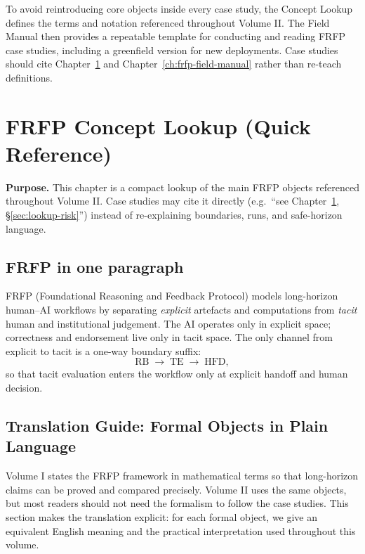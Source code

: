 To avoid reintroducing core objects inside every case study, the Concept Lookup defines the terms and notation referenced throughout Volume II. The Field Manual then provides a repeatable template for conducting and reading FRFP case studies, including a greenfield version for new deployments. Case studies should cite Chapter~\ref{ch:frfp-lookup} and Chapter~\ref{ch:frfp-field-manual} rather than re-teach definitions.


\chapter{FRFP Concept Lookup (Quick Reference)}
\label{ch:frfp-lookup}

\noindent\textbf{Purpose.}
This chapter is a compact lookup of the main FRFP objects referenced throughout Volume II.
Case studies may cite it directly (e.g.\ ``see Chapter~\ref{ch:frfp-lookup}, \S\ref{sec:lookup-risk}'')
instead of re-explaining boundaries, runs, and safe-horizon language.

\section{FRFP in one paragraph}
FRFP (Foundational Reasoning and Feedback Protocol) models long-horizon human--AI workflows by
separating \emph{explicit} artefacts and computations from \emph{tacit} human and institutional
judgement. The AI operates only in explicit space; correctness and endorsement live only in tacit
space. The only channel from explicit to tacit is a one-way boundary suffix:
\[
\mathrm{RB} \;\to\; \mathrm{TE} \;\to\; \mathrm{HFD},
\]
so that tacit evaluation enters the workflow only at explicit handoff and human decision.
\section{Translation Guide: Formal Objects in Plain Language}
\label{sec:lookup-translation}

Volume I states the FRFP framework in mathematical terms so that long-horizon claims can be proved
and compared precisely. Volume II uses the same objects, but most readers should not need the
formalism to follow the case studies. This section makes the translation explicit: for each formal
object, we give an equivalent English meaning and the practical interpretation used throughout this
volume.

